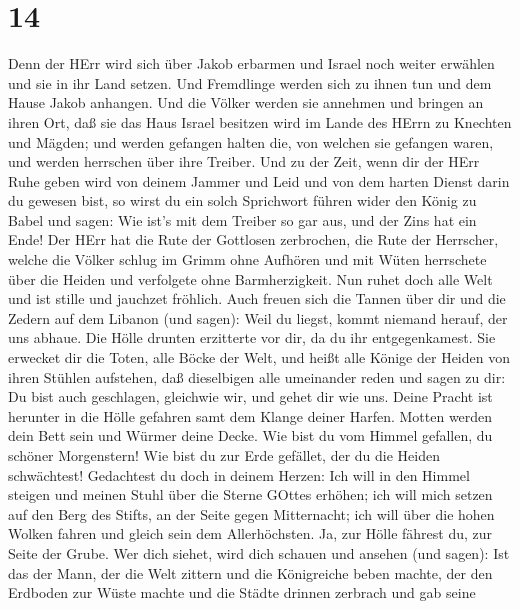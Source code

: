 \hypertarget{section-13}{%
\section{14}\label{section-13}}

 Denn der HErr wird sich über Jakob erbarmen und Israel noch
weiter erwählen und sie in ihr Land setzen. Und Fremdlinge werden sich
zu ihnen tun und dem Hause Jakob anhangen.  Und die Völker
werden sie annehmen und bringen an ihren Ort, daß sie das Haus Israel
besitzen wird im Lande des HErrn zu Knechten und Mägden; und werden
gefangen halten die, von welchen sie gefangen waren, und werden
herrschen über ihre Treiber.  Und zu der Zeit, wenn dir der
HErr Ruhe geben wird von deinem Jammer und Leid und von dem harten
Dienst darin du gewesen bist,  so wirst du ein solch
Sprichwort führen wider den König zu Babel und sagen: Wie ist's mit dem
Treiber so gar aus, und der Zins hat ein Ende!  Der HErr hat
die Rute der Gottlosen zerbrochen, die Rute der Herrscher, 
welche die Völker schlug im Grimm ohne Aufhören und mit Wüten herrschete
über die Heiden und verfolgete ohne Barmherzigkeit.  Nun
ruhet doch alle Welt und ist stille und jauchzet fröhlich. 
Auch freuen sich die Tannen über dir und die Zedern auf dem Libanon (und
sagen): Weil du liegst, kommt niemand herauf, der uns abhaue.
 Die Hölle drunten erzitterte vor dir, da du ihr
entgegenkamest. Sie erwecket dir die Toten, alle Böcke der Welt, und
heißt alle Könige der Heiden von ihren Stühlen aufstehen, 
daß dieselbigen alle umeinander reden und sagen zu dir: Du bist auch
geschlagen, gleichwie wir, und gehet dir wie uns.  Deine
Pracht ist herunter in die Hölle gefahren samt dem Klange deiner Harfen.
Motten werden dein Bett sein und Würmer deine Decke.  Wie
bist du vom Himmel gefallen, du schöner Morgenstern! Wie bist du zur
Erde gefället, der du die Heiden schwächtest!  Gedachtest
du doch in deinem Herzen: Ich will in den Himmel steigen und meinen
Stuhl über die Sterne GOttes erhöhen;  ich will mich setzen
auf den Berg des Stifts, an der Seite gegen Mitternacht; ich will über
die hohen Wolken fahren und gleich sein dem Allerhöchsten. 
Ja, zur Hölle fährest du, zur Seite der Grube.  Wer dich
siehet, wird dich schauen und ansehen (und sagen): Ist das der Mann, der
die Welt zittern und die Königreiche beben machte,  der den
Erdboden zur Wüste machte und die Städte drinnen zerbrach und gab seine
